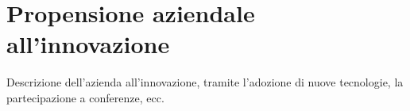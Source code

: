 \section{Propensione aziendale all'innovazione}
\label{sez:propensione-a-innovazione}

Descrizione dell'azienda all'innovazione, tramite l'adozione di nuove tecnologie, la partecipazione a conferenze, ecc.\\